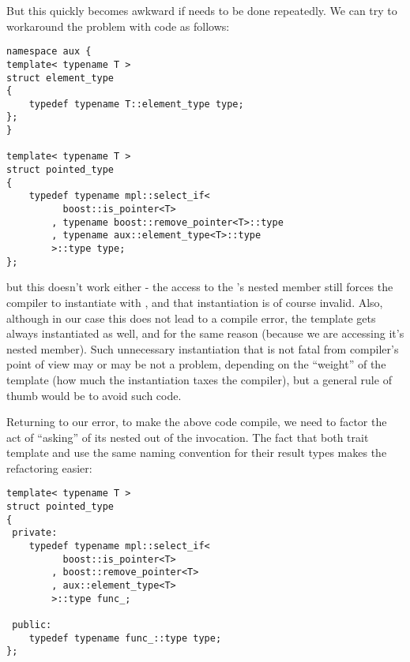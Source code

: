 \documentclass{kapproc}
\begin{document}
But this quickly becomes awkward if needs to be done 
repeatedly. We can try to workaround the problem with 
 code as follows:

{\small
\begin{codesamp}\begin{verbatim}
namespace aux {
template< typename T >
struct element_type
{
	typedef typename T::element_type type;
};
}

template< typename T >
struct pointed_type
{
    typedef typename mpl::select_if<
          boost::is_pointer<T>
        , typename boost::remove_pointer<T>::type
        , typename aux::element_type<T>::type
        >::type type;
};
\end{verbatim}
\end{codesamp}
}

but this doesn't work either - the access to the 
's nested  member still 
forces the compiler to instantiate 
with , and that instantiation is of course 
invalid. Also, although in our case this does not lead to a 
compile error, the  template 
gets always instantiated as well, and for the same reason 
(because we are accessing it's nested  member). 
Such unnecessary instantiation that is not fatal from 
compiler's point of view may or may be not a problem, 
depending on the ``weight'' of the template (how much the 
instantiation taxes the compiler), but a general rule of 
thumb would be to avoid such code.

Returning to our error, to make the above code compile, we 
need to factor the act of ``asking'' 
of its nested  out of the  
invocation. The fact that both 
trait template and  use the same 
naming convention for their result types makes the refactoring 
easier:

{\small
\begin{codesamp}\begin{verbatim}
template< typename T >
struct pointed_type
{
 private:
    typedef typename mpl::select_if<
          boost::is_pointer<T>
        , boost::remove_pointer<T>
        , aux::element_type<T>
        >::type func_;

 public:
    typedef typename func_::type type;
};
\end{verbatim}
\end{codesamp}
}
\end{document}
